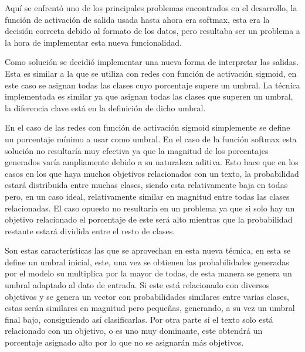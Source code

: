 Aquí se enfrentó uno de los principales problemas encontrados en el desarrollo,
la función de activación de salida usada hasta ahora era softmax, esta era la
decisión correcta debido al formato de los datos, pero resultaba ser un problema
a la hora de implementar esta nueva funcionalidad.

Como solución se decidió implementar una nueva forma de interpretar las salidas.
Esta es similar a la que se utiliza con redes con función de activación sigmoid,
en este caso se asignan todas las clases  cuyo porcentaje supere un umbral. La
técnica implementada es similar ya que asignan todas las clases que superen un
umbral, la diferencia clave está en la definición de dicho umbral.

En el caso de las redes con función de activación sigmoid simplemente se define
un porcentaje mínimo a usar como umbral. En el caso de la función softmax esta
solución no resultaría muy efectiva ya que la magnitud de los porcentajes
generados varía ampliamente debido a su naturaleza aditiva. Esto hace que en los
casos en los que haya muchos objetivos relacionados con un texto, la
probabilidad estará distribuida entre muchas clases, siendo esta relativamente
baja en todas pero, en un caso ideal, relativamente similar en magnitud entre
todas las clases relacionadas. El caso opuesto no resultaría en un problema ya
que si solo hay un objetivo relacionado el porcentaje de este será alto mientras
que la probabilidad restante estará dividida entre el resto de clases. 

Son estas características las que se aprovechan en esta nueva técnica, en esta
se define un umbral inicial, este, una vez se obtienen las probabilidades
generadas por el modelo su multiplica por la mayor de todas, de esta manera se
genera un umbral adaptado al dato de entrada. Si este está relacionado con
diversos objetivos y se genera un vector con probabilidades similares entre
varias clases, estas serán similares en magnitud pero pequeñas, generando, a su
vez un umbral final bajo, consiguiendo así clasificarlas. Por otra parte si el
texto solo está relacionado con un objetivo, o es uno muy dominante, este
obtendrá un porcentaje asignado alto por lo que no se asignarán más objetivos. 



